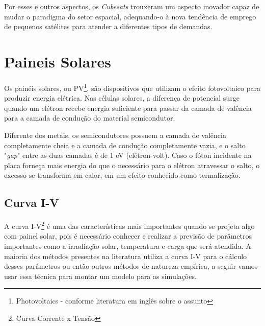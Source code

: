 \noindent
\begin{minipage}{\linewidth}
\label{cubesat1U_dimensions_fig}
\end{minipage}

Por esses e outros aspectos, os \textit{Cubesats} trouxeram um aspecto inovador capaz de mudar o paradigma do setor espacial, adequando-o à nova tendência de emprego de pequenos satélites para atender a diferentes tipos de demandas.

\section{Paineis Solares}
Os painéis solares, ou PV\footnote{Photovoltaics - conforme literatura em inglês sobre o assunto}, são dispositivos que utilizam o efeito fotovoltaico para produzir energia elétrica. Nas células solares, a diferença de potencial surge quando um elétron recebe energia suficiente para passar da camada de valência para a camada de condução do material semicondutor.

Diferente dos metais, os semicondutores possuem a camada de valência completamente cheia e a camada de condução completamente vazia, e o salto "\textit{gap}" entre as duas camadas é de 1 eV (elétron-volt). Caso o fóton incidente na placa forneça mais energia do que o necessário para o elétron atravessar o salto, o excesso se transforma em calor, em um efeito conhecido como termalização.

\subsection*{Curva I-V}
A curva I-V\footnote{Curva Corrente x Tensão} é uma das características mais importantes quando se projeta algo com painel solar, pois é necessário conhecer e realizar a previsão de parâmetros importantes como a irradiação solar, temperatura e carga que será atendida. A maioria dos métodos presentes na literatura utiliza a curva I-V para o cálculo desses parâmetros ou então outros métodos de natureza empírica, a seguir vamos usar essa técnica\cite{pv_datasheet} para montar um modelo para as simulações.

